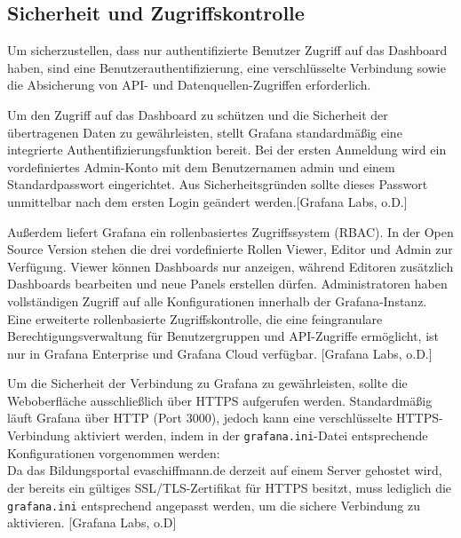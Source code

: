 \subsection{Sicherheit und Zugriffskontrolle}
Um sicherzustellen, dass nur authentifizierte Benutzer Zugriff auf das Dashboard haben, sind eine Benutzerauthentifizierung, eine verschlüsselte Verbindung sowie die Absicherung von API- und Datenquellen-Zugriffen erforderlich.

Um den Zugriff auf das Dashboard zu schützen und die Sicherheit der übertragenen Daten zu gewährleisten, stellt Grafana standardmäßig eine integrierte Authentifizierungsfunktion bereit. Bei der ersten Anmeldung wird ein vordefiniertes Admin-Konto mit dem Benutzernamen admin und einem Standardpasswort eingerichtet. Aus Sicherheitsgründen sollte dieses Passwort unmittelbar nach dem ersten Login geändert werden.[Grafana Labs, o.D.]  

Außerdem liefert Grafana ein rollenbasiertes Zugriffssystem (RBAC). In der Open Source Version stehen die drei vordefinierte Rollen Viewer, Editor und Admin zur Verfügung. Viewer können Dashboards nur anzeigen, während Editoren zusätzlich Dashboards bearbeiten und neue Panels erstellen dürfen. Administratoren haben vollständigen Zugriff auf alle Konfigurationen innerhalb der Grafana-Instanz. Eine erweiterte rollenbasierte Zugriffskontrolle, die eine feingranulare Berechtigungsverwaltung für Benutzergruppen und API-Zugriffe ermöglicht, ist nur in Grafana Enterprise und Grafana Cloud verfügbar. [Grafana Labs, o.D.]

Um die Sicherheit der Verbindung zu Grafana zu gewährleisten, sollte die Weboberfläche ausschließlich über HTTPS aufgerufen werden. Standardmäßig läuft Grafana über HTTP (Port 3000), jedoch kann eine verschlüsselte HTTPS-Verbindung aktiviert werden, indem in der \texttt{grafana.ini}-Datei entsprechende Konfigurationen vorgenommen werden: \\



Da das Bildungsportal evaschiffmann.de derzeit auf einem Server gehostet wird, der bereits ein gültiges SSL/TLS-Zertifikat für HTTPS besitzt, muss lediglich die \texttt{grafana.ini} entsprechend angepasst werden, um die sichere Verbindung zu aktivieren. [Grafana Labs, o.D]





